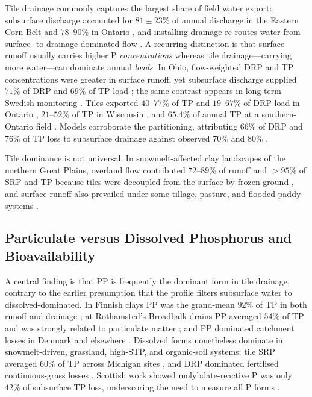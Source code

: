 \documentclass[11pt]{article}
\begin{document}
Tile drainage commonly captures the largest share of field water export:
subsurface discharge accounted for $81\pm23\%$ of annual discharge in the
Eastern Corn Belt \parencite{Pease2018} and $78$--$90\%$ in Ontario
\parencite{VanEsbroeck2016}, and installing drainage re-routes water from
surface- to drainage-dominated flow \parencite{Turtola1995,BENGTSON1995}. A
recurring distinction is that surface runoff usually carries higher P
\emph{concentrations} whereas tile drainage---carrying more water---can
dominate annual \emph{loads}. In Ohio, flow-weighted DRP and TP
concentrations were greater in surface runoff, yet subsurface discharge
supplied $71\%$ of DRP and $69\%$ of TP load \parencite{Pease2018}; the same
contrast appears in long-term Swedish monitoring \parencite{Norberg2022}.
Tiles exported $40$--$77\%$ of TP and $19$--$67\%$ of DRP load in Ontario
\parencite{VanEsbroeck2016}, $21$--$52\%$ of TP in Wisconsin
\parencite{Madison2014}, and $65.4\%$ of annual TP at a southern-Ontario
field \parencite{Qi2018}. Models corroborate the partitioning, attributing
$66\%$ of DRP and $76\%$ of TP loss to subsurface drainage against observed
$70\%$ and $80\%$ \parencite{Grewal2025,Sadhukhan2019b}.

Tile dominance is not universal. In snowmelt-affected clay landscapes of the
northern Great Plains, overland flow contributed $72$--$89\%$ of runoff and
$>95\%$ of SRP and TP because tiles were decoupled from the surface by
frozen ground \parencite{Kokulan2019b,Kokulan2021}, and surface runoff also
prevailed under some tillage, pasture, and flooded-paddy systems
\parencite{Zhao2001,Melland2008,DarziNaftchali2016}.

\subsection{Particulate versus Dissolved Phosphorus and Bioavailability}

A central finding is that PP is frequently the dominant form in tile
drainage, contrary to the earlier presumption that the profile filters
subsurface water to dissolved-dominated. In Finnish clays PP was the
grand-mean $92\%$ of TP in both runoff and drainage \parencite{Uusitalo2001};
at Rothamsted's Broadbalk drains PP averaged $54\%$ of TP and was strongly
related to particulate matter \parencite{Lu2003,Lu2004}; and PP dominated
catchment losses in Denmark and elsewhere
\parencite{Grant1996,Brendel2019,vanderSalm2012}. Dissolved forms
nonetheless dominate in snowmelt-driven, grassland, high-STP, and
organic-soil systems: tile SRP averaged $60\%$ of TP across Michigan sites
\parencite{Clement2017}, and DRP dominated fertilised continuous-grass
losses \parencite{Zhang2015b}. Scottish work showed molybdate-reactive P was
only $42\%$ of subsurface TP loss, underscoring the need to measure all P
forms \parencite{Hooda1999}.
\end{document}
